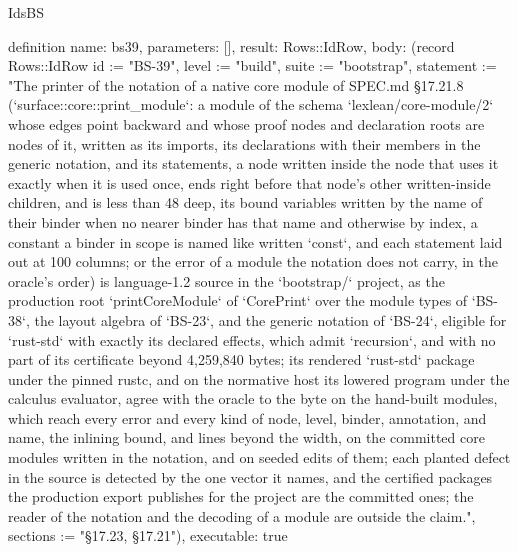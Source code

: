 \begin{lexlean}{IdsBS}
\begin{semanticmodule}
definition{
  name: bs39,
  parameters: [],
  result: Rows::IdRow,
  body: (record Rows::IdRow {id := "BS-39", level := "build", suite := "bootstrap", statement := "The printer of the notation of a native core module of SPEC.md §17.21.8 (`surface::core::print_module`: a module of the schema `lexlean/core-module/2` whose edges point backward and whose proof nodes and declaration roots are nodes of it, written as its imports, its declarations with their members in the generic notation, and its statements, a node written inside the node that uses it exactly when it is used once, ends right before that node's other written-inside children, and is less than 48 deep, its bound variables written by the name of their binder when no nearer binder has that name and otherwise by index, a constant a binder in scope is named like written `const`, and each statement laid out at 100 columns; or the error of a module the notation does not carry, in the oracle's order) is language-1.2 source in the `bootstrap/` project, as the production root `printCoreModule` of `CorePrint` over the module types of `BS-38`, the layout algebra of `BS-23`, and the generic notation of `BS-24`, eligible for `rust-std` with exactly its declared effects, which admit `recursion`, and with no part of its certificate beyond 4,259,840 bytes; its rendered `rust-std` package under the pinned rustc, and on the normative host its lowered program under the calculus evaluator, agree with the oracle to the byte on the hand-built modules, which reach every error and every kind of node, level, binder, annotation, and name, the inlining bound, and lines beyond the width, on the committed core modules written in the notation, and on seeded edits of them; each planted defect in the source is detected by the one vector it names, and the certified packages the production export publishes for the project are the committed ones; the reader of the notation and the decoding of a module are outside the claim.", sections := "§17.23, §17.21"}),
  executable: true
}


\end{semanticmodule}
\end{lexlean}
